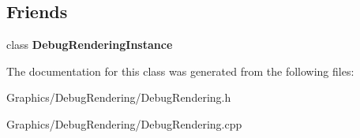\subsection*{Friends}
\begin{DoxyCompactItemize}
\item 
\mbox{\label{classDebugRendering_aa2fce3a4ae64b69f01e0fd64ba26023a}} 
class {\bfseries Debug\+Rendering\+Instance}
\end{DoxyCompactItemize}


The documentation for this class was generated from the following files\+:\begin{DoxyCompactItemize}
\item 
Graphics/\+Debug\+Rendering/Debug\+Rendering.\+h\item 
Graphics/\+Debug\+Rendering/Debug\+Rendering.\+cpp\end{DoxyCompactItemize}
